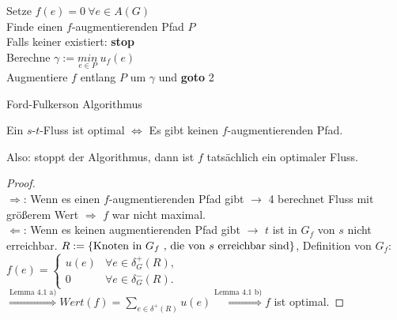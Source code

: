 \begin{algorithm}
	\vspace*{5pt}
	Setze $f(e)=0~\forall e\in A(G)$\\
	Finde einen $f$-augmentierenden Pfad $P$\\
	\hspace*{15pt}Falls keiner existiert: \textbf{stop} \\
	Berechne $\gamma := \underset{e\in P}{min}~ u_f(e)$\\
	\hspace*{15pt}Augmentiere $f$ entlang $P$ um $\gamma$ und \textbf{goto} 2
	\caption{Ford-Fulkerson Algorithmus}
	\label{fig:Algorithmus}
\end{algorithm}
\begin{satz}
	Ein $s$-$t$-Fluss ist optimal $\Leftrightarrow$ Es gibt keinen $f$-augmentierenden Pfad.
\end{satz}
Also: stoppt der Algorithmus, dann ist $f$ tatsächlich ein optimaler Fluss.
\begin{proof}~\\
	$\Rightarrow$: Wenn es einen $f$-augmentierenden Pfad gibt $\to$ 4 berechnet Fluss mit größerem Wert $\Rightarrow$ $f$ war nicht maximal.\\
	$\Leftarrow$: Wenn es keinen augmentierenden Pfad gibt $\to$ $t$ ist in $G_f$ von $s$ nicht erreichbar. $R:= \{\text{Knoten in } G_f \text{ , die von } s \text{ erreichbar sind}\}$, Definition von $G_f$:\\ $f(e) = \begin{cases}
		u(e) & \forall e \in \delta_G^+(R),\\
		0 & \forall e \in \delta_G^-(R).
	\end{cases}$
	$\overset{\text{Lemma 4.1 a)}}{\Rightarrow} Wert(f) = \sum_{e \in \delta^+(R)} u(e) \overset{\text{Lemma 4.1 b)}}{\Rightarrow} f$ ist optimal.
\end{proof}